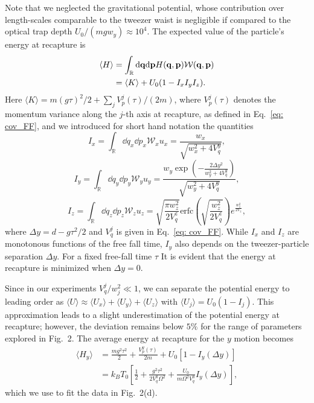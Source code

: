 \documentclass[aps,amssymb,amsmath,prb,superscriptaddress,reprint,notitlepage,onecolumn]{revtex4-1}
\newcommand{\<}{\langle}
\renewcommand{\>}{\rangle}
\begin{document}
%
Note that we neglected the gravitational potential, whose contribution over length-scales comparable to the tweezer waist is negligible if compared to the optical trap depth $U_0/(mgw_y)\approx 10^4$.
%
The expected value of the particle's energy at recapture is
%
\begin{equation}
	\begin{aligned}
		\langle H \rangle & =\int_{\mathbb{R}} \dd\vb{q}\dd\vb{p} H(\vb{q},\vb{p})\mathcal{W}(\vb{q},\vb{p})\\
		&=\langle K \rangle + U_0(1-I_x I_y I_z).
	\end{aligned}
\end{equation}
%
Here $\langle K \rangle = m (g\tau)^2/2 + \sum_j V_{p}^j(\tau)/(2m)$, where $V_{p}^j(\tau)$ denotes the momentum variance along the $j$-th axis at recapture, as defined in Eq.~\ref{eq: cov_FF}, and we introduced for short hand notation the quantities
%
\begin{equation}
	I_x =\int_{\mathbb{R}} \dd q_x\dd p_x \mathcal{W}_x u_x=\frac{w_x}{\sqrt{w_x^2+4 V_{q}^y}},
\end{equation}
%
\begin{equation}
	I_y =\int_{\mathbb{R}} \dd q_y\dd p_y \mathcal{W}_y u_y =\frac{w_y \exp\left( - \frac{2\Delta y^2}{w_y^2+4 V_{q}^y}\right)}{\sqrt{w_y^2+4 V_{q}^y}}
    ,
\end{equation}
%
\begin{equation}
 I_z=\int_{\mathbb{R}} \dd q_z\dd p_z \mathcal{W}_z u_z = \sqrt{\frac{\pi w_z^2}{2V_q^z}}\text{erfc}\left(\sqrt{\frac{w_z^2}{2V_q^z}}\right) e^{\frac{w_z^2}{2V_z}},
\end{equation}
%
where $\Delta y= d-g\tau^2/2$ and $V_q^j$ is given in Eq.~\ref{eq: cov_FF}.
%
While $I_x$ and $I_z$ are monotonous functions of the free fall time, $I_y$ also depends on the tweezer-particle separation $\Delta y$.
%
For a fixed free-fall time $\tau$ It is evident that the energy at recapture is minimized when $\Delta y=0$.

Since in our experiments $V_q^j/w_j^2\ll 1$, we can separate the potential energy to leading order as $\langle U\rangle\approx\langle U_x \rangle+\langle U_y \rangle+\langle U_z \rangle$ with $\langle U_j \rangle = U_0(1-I_j)$.
%
This approximation leads to a slight underestimation of the potential energy at recapture; however, the deviation remains below $5\%$ for the range of parameters explored in Fig.~2.
%
The average energy at recapture for the $y$ motion becomes
%
\begin{equation}
	\begin{aligned}
		\langle H_y \rangle  &  = \frac{m g^2\tau^2}{2} + \frac{V_p^y(\tau)}{2 m} + U_0[1-I_y(\Delta y)]\\
		&=k_B T_0\left[ \frac{1}{2}+ \frac{g^2\tau^2}{2V_q^0\Omega^2}+\frac{U_0}{m\Omega^2V_q^0}I_y(\Delta y) \right],
	\end{aligned}
\end{equation}
%
which we use to fit the data in Fig.~2(d).
\end{document}
